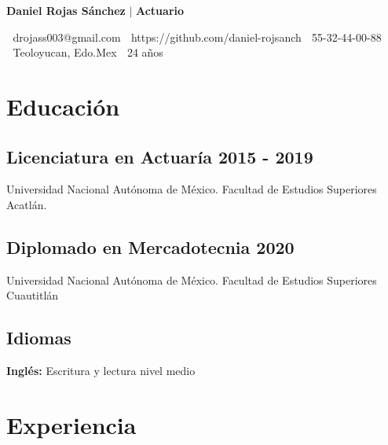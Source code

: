 \documentclass[11pt,letterpaper]{article}
\begin{document}
\rmfamily
\color{txt}

\begin{center}
    \huge{ \textcolor{title}{\textbf{Daniel Rojas Sánchez} $|$ }\huge{\textbf{Actuario}}\\
    \vspace{10pt}}
  
\normalsize{
  \textcolor{txt}{
    {\ttfamily }\hspace{0.1cm} drojass003@gmail.com \hspace{0.27cm} 
    {\ttfamily }\hspace{0.1cm} https://github.com/daniel-rojsanch\hspace{0.27cm} 
    {\ttfamily }\hspace{0.1cm} 55-32-44-00-88}\\
 
    \textcolor{txt}{
    {\ttfamily }\hspace{0.1cm} Teoloyucan, Edo.Mex\hspace{0.27cm} 
    {\ttfamily }\hspace{0.1cm} 24 años}
    }
\end{center}


\section*{\textcolor{title}{Educación \hrulefill} }
\subsection*{Licenciatura en Actuaría \hfill {\small\textbf{2015 - 2019}} }
Universidad Nacional Autónoma de México. Facultad de Estudios Superiores Acatlán.


\subsection*{Diplomado en Mercadotecnia \hfill {\small\textbf{2020}} }
Universidad Nacional Autónoma de México. Facultad de Estudios Superiores Cuautitlán

\subsection*{Idiomas}
\textbf{Inglés: }  Escritura y lectura nivel medio



\section*{\textcolor{title}{Experiencia \hrulefill} } %
\end{document}
